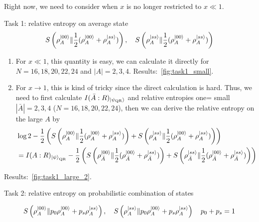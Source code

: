 \documentclass{article}
\theoremstyle{plain}
\theoremstyle{definition}
\theoremstyle{plain}
\begin{document}
Right now, we need to consider when $x$ is no longer restricted to $x\ll 1$. 

Task 1: relative entropy on average state
\begin{equation}
    S\left(\rho_{A}^{\ket{00}} \|\frac{1}{2}(\rho_{A}^{\ket{00}}+ \rho_{A}^{\ket{ss}})\right),\quad S\left(\rho_{A}^{\ket{ss}} \|\frac{1}{2}(\rho_{A}^{\ket{00}}+ \rho_{A}^{\ket{ss}})\right)
\end{equation}

\begin{enumerate}
    \item For $x\ll 1$, this quantity is easy, we can calculate it directly for $N=16,18,20,22,24$ and $|A|=2,3,4$. Results:~\cref{fig:task1_small}.
    
    \item For $x \rightarrow 1$, this is kind of tricky since the direct calculation is hard. Thus, we need to first calculate $I(\bar{A}:R)_{\ket{\psi_{\text{QR}}}}$ and relative entropies one= small $|\bar{A}|=2,3,4$ ($N=16,18,20,22,24$), then we can derive the relative entropy on the large $A$ by
    \begin{equation}
    \begin{aligned}
    &\log 2-\frac{1}{2}\left(S\left(\rho_{A}^{\ket{00}} \|\frac{1}{2}(\rho_{A}^{\ket{00}}+ \rho_{A}^{\ket{ss}})\right)+S\left(\rho_{A}^{\ket{ss}} \|\frac{1}{2}(\rho_{A}^{\ket{00}}+ \rho_{A}^{\ket{ss}})\right)\right)\\
    &=I(A:R)_{\ket{\psi}_{\text{QR}}}-\frac{1}{2}\left(S\left(\rho_{\bar A}^{\ket{00}} \|\frac{1}{2}(\rho_{\bar A}^{\ket{00}}+ \rho_{\bar A}^{\ket{ss}})\right)+S\left(\rho_{\bar A}^{\ket{ss}} \|\frac{1}{2}(\rho_{\bar A}^{\ket{00}}+ \rho_{\bar A}^{\ket{ss}})\right)\right)
    \end{aligned}
    \end{equation}
\end{enumerate}

Results:~\cref{fig:task1_large_2}.

Task 2: relative entropy on probabilistic combination of states

\begin{equation}
    S\left(\rho_{A}^{\ket{00}}\|p_0\rho_{A}^{\ket{00}}+p_s\rho_{A}^{\ket{ss}}\right),\quad S\left(\rho_{A}^{\ket{ss}}\|p_0\rho_{A}^{\ket{00}}+p_s\rho_{A}^{\ket{ss}}\right)\quad p_0+p_s=1
\end{equation}
\end{document}
